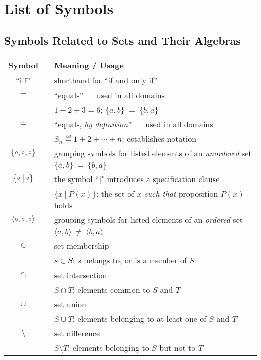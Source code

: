 
\chapter{List of Symbols}

\section*{Symbols Related to Sets and Their Algebras}

\begin{tabular}{c|cl}
{\bf Symbol} &  & {\bf Meaning} / {\bf Usage} \\ \hline
``iff''
  & & shorthand for ``if and only if'' \\
$=$
  & & ``equals'' --- used in all domains \\
  & & $1 + 2 + 3 = 6$; $\{a,b\} \ = \ \{b,a\}$ \\ \hline
$\eqdef$
  & & ``equals, {\em by definition}'' --- used in all domains \\
  & & $S_n \eqdef 1 + 2 + \cdots + n$: establishes notation \\ \hline
$\{ \circ, \circ, \circ \}$ 
  & & grouping symbols for listed elements of an {\em unordered} set \\
  & & $\{a,b\} \ = \ \{b,a\}$ \\ \hline
$\{ \circ \ | \ \circ \}$
  & & the symbol ``$|$" introduces a specification clause \\
  & & $\{x \ | \ P(x) \}$: the set of $x$ {\em such that} proposition $P(x)$ holds
   \\ \hline
$\langle \circ, \circ, \circ \rangle$
  & & grouping symbols for listed elements of an {\em ordered} set \\
  & & $\langle a,b\rangle \ \neq \ \langle b,a\rangle$ \\ \hline
$\in$
  & & set membership \\
  & & $s \in S$: $s$ belongs to, or is a member of $S$ \\ \hline
$\cap$
  & & set intersection \\
  &  & $S \cap T$: elements common to $S$ and $T$ \\ \hline
$\cup$
  &  & set union \\
  &  & $S \cup T$: elements belonging to at least one of $S$ and $T$ \\ \hline
$\setminus$
  & & set difference \\ 
  & & $S \setminus T$: elements belonging to $S$ but not to $T$ \\

\end{tabular}
